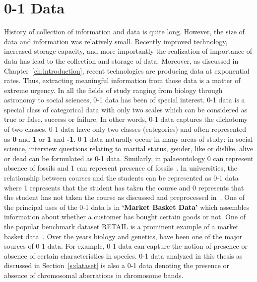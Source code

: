 \section{0-1 Data}
\label{s:binarydata}
History of collection of information and data is quite long. However, the size of data and information was relatively small. Recently improved technology, increased storage capacity, and more importantly the realization of importance of data has lead to the collection and storage of data. Moreover, as discussed in Chapter~\ref{ch:introduction}, recent technologies are producing data at exponential rates. Thus, extracting meaningful information from those data is a matter of extreme urgency. In all the fields of study ranging from biology through astronomy to social sciences, 0-1 data has been of special interest. 0-1 data is a special class of categorical data with only two scales which can be considered as true or false, success or failure. In other words, 0-1 data captures the dichotomy of two classes. 0-1 data have only two classes (categories) and often represented as \textbf{0} and  \textbf{1} or \textbf{1} and \textbf{-1}. 0-1 data naturally occur in many areas of study: in social science, interview questions relating to marital status, gender, like or dislike, alive or dead can be formulated as 0-1 data. Similarly, in palaeontology 0 can represent absence of fossils and 1 can represent presence of fossils~\cite{Puolamaki06pcbi}. In universities, the relationship between courses and the students can be represented as 0-1 data where 1 represents that the student has taken the course and 0 represents that the student has not taken the course as discussed and preprocessed in~\cite{randomization}. One of the principal uses of the 0-1 data is in \textbf{`Market Basket Data'} which assembles information about whether a customer has bought certain goods or not. One of the popular benchmark dataset RETAIL is a prominent example of a market basket data~\cite{retail}. Over the years biology and genetics, have been one of the major sources of 0-1 data. For example, 0-1 data can capture the notion of presence or absence of certain characteristics in species. 0-1 data analyzed in this thesis as discussed in Section~\ref{s:dataset} is also a 0-1 data denoting the presence or absence of chromosomal aberrations in chromosome bands. 



